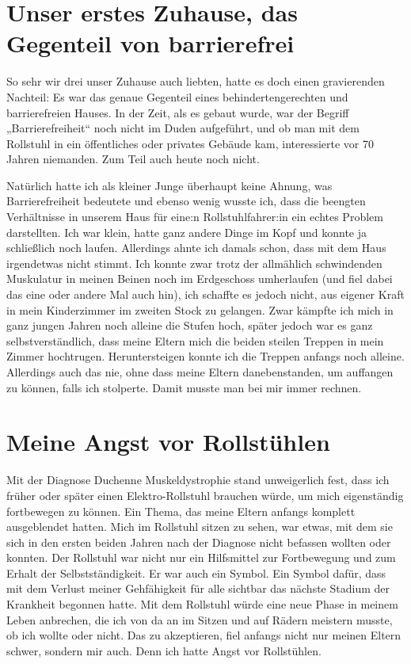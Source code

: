 \documentclass[fontsize=12pt,a4paper,headinclude,DIV=calc,automark]{scrbook}
\begin{document}
\section{Unser erstes Zuhause, das Gegenteil von barrierefrei}

So sehr wir drei unser Zuhause auch liebten, hatte es doch einen gravierenden Nachteil: Es war das genaue Gegenteil eines behindertengerechten und barrierefreien Hauses. In der Zeit, als es gebaut wurde, war der Begriff „Barrierefreiheit“ noch nicht im Duden aufgeführt, und ob man mit dem Rollstuhl in ein öffentliches oder privates Gebäude kam, interessierte vor 70 Jahren niemanden. Zum Teil auch heute noch nicht.

Natürlich hatte ich als kleiner Junge überhaupt keine Ahnung, was Barrierefreiheit bedeutete und ebenso wenig wusste ich, dass die beengten Verhältnisse in unserem Haus für eine:n Rollstuhlfahrer:in ein echtes Problem darstellten. Ich war klein, hatte ganz andere Dinge im Kopf und konnte ja schließlich noch laufen. Allerdings ahnte ich damals schon, dass mit dem Haus irgendetwas nicht stimmt. Ich konnte zwar trotz der allmählich schwindenden Muskulatur in meinen Beinen noch im Erdgeschoss umherlaufen (und fiel dabei das eine oder andere Mal auch hin), ich schaffte es jedoch nicht, aus eigener Kraft in mein Kinderzimmer im zweiten Stock zu gelangen. Zwar kämpfte ich mich in ganz jungen Jahren noch alleine die Stufen hoch, später jedoch war es ganz selbstverständlich, dass meine Eltern mich die beiden steilen Treppen in mein Zimmer hochtrugen. Heruntersteigen konnte ich die Treppen anfangs noch alleine. Allerdings auch das nie, ohne dass meine Eltern danebenstanden, um auffangen zu können, falls ich stolperte. Damit musste man bei mir immer rechnen.

\section{Meine Angst vor Rollstühlen}

Mit der Diagnose Duchenne Muskeldystrophie stand unweigerlich fest, dass ich früher oder später einen Elektro-Rollstuhl brauchen würde, um mich eigenständig fortbewegen zu können. Ein Thema, das meine Eltern anfangs komplett ausgeblendet hatten. Mich im Rollstuhl sitzen zu sehen, war etwas, mit dem sie sich in den ersten beiden Jahren nach der Diagnose nicht befassen wollten oder konnten. Der Rollstuhl war nicht nur ein Hilfsmittel zur Fortbewegung und zum Erhalt der Selbstständigkeit. Er war auch ein Symbol. Ein Symbol dafür, dass mit dem Verlust meiner Gehfähigkeit für alle sichtbar das nächste Stadium der Krankheit begonnen hatte. Mit dem Rollstuhl würde eine neue Phase in meinem Leben anbrechen, die ich von da an im Sitzen und auf Rädern meistern musste, ob ich wollte oder nicht. Das zu akzeptieren, fiel anfangs nicht nur meinen Eltern schwer, sondern mir auch. Denn ich hatte Angst vor Rollstühlen.
\end{document}
